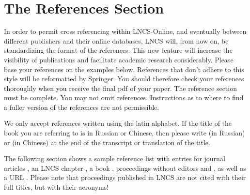 \documentclass[runningheads,a4paper]{llncs}
\begin{document}
\section{The References Section}\label{references}

In order to permit cross referencing within LNCS-Online, and eventually
between different publishers and their online databases, LNCS will,
from now on, be standardizing the format of the references. This new
feature will increase the visibility of publications and facilitate
academic research considerably. Please base your references on the
examples below. References that don't adhere to this style will be
reformatted by Springer. You should therefore check your references
thoroughly when you receive the final pdf of your paper.
The reference section must be complete. You may not omit references.
Instructions as to where to find a fuller version of the references are
not permissible.

We only accept references written using the latin alphabet. If the title
of the book you are referring to is in Russian or Chinese, then please write
(in Russian) or (in Chinese) at the end of the transcript or translation
of the title.

The following section shows a sample reference list with entries for
journal articles \cite{jour}, an LNCS chapter \cite{lncschap}, a book
\cite{book}, proceedings without editors \cite{proceeding1} and
\cite{proceeding2}, as well as a URL \cite{url}.
Please note that proceedings published in LNCS are not cited with their
full titles, but with their acronyms!
\end{document}
